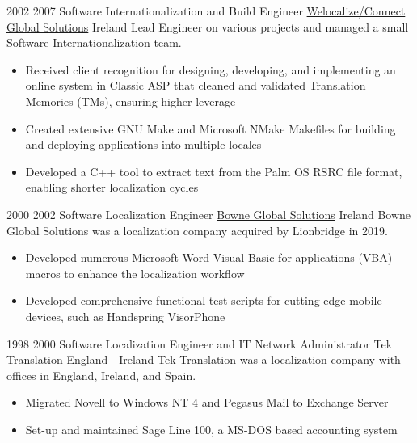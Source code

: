 \begin{twenty}
\twentyitem
  {2002}
  {2007}
  {Software Internationalization and Build Engineer}
  {\href{https://www.welocalize.com/}{Welocalize/Connect Global Solutions}}
  {Ireland}
  {Lead Engineer on various projects and managed a small Software Internationalization team.}
  {}
  {\begin{itemize}
    \item Received client recognition for designing, developing, and implementing an online system in Classic ASP that cleaned and validated Translation Memories (TMs), ensuring higher leverage
    \item Created extensive GNU Make and Microsoft NMake Makefiles for building and deploying applications into multiple locales
    \item Developed a C++ tool to extract text from the Palm OS RSRC file format, enabling shorter localization cycles
  \end{itemize}
  }
\end{twenty}

\begin{twenty}
\twentyitem
  {2000}
  {2002}
  {Software Localization Engineer}
  {\href{https://www.lionbridge.com/}{Bowne Global Solutions}}
  {Ireland}
  {Bowne Global Solutions was a localization company acquired by Lionbridge in 2019.}
  {}
  {\begin{itemize}
    \item Developed numerous Microsoft Word Visual Basic for applications (VBA) macros to enhance the localization workflow
    \item Developed comprehensive functional test scripts for cutting edge mobile devices, such as Handspring VisorPhone
  \end{itemize}
  }
\end{twenty}

\begin{twenty}
\twentyitem
  {1998}
  {2000}
  {Software Localization Engineer and IT Network Administrator}
  {Tek Translation}
  {England - Ireland}
  {Tek Translation was a localization company with offices in England, Ireland, and Spain.}
  {}
  {\begin{itemize}
    \item Migrated Novell to Windows NT 4 and Pegasus Mail to Exchange Server
    \item Set-up and maintained Sage Line 100, a MS-DOS based accounting system
  \end{itemize}
  }
\end{twenty}
